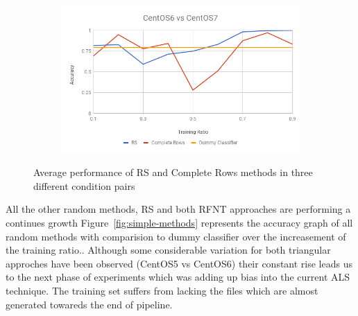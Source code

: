 \documentclass[10pt, conference, compsocconf]{IEEEtran}
\begin{document}
\begin{figure}[h!]
\begin{subfigure}[b]{0.4\linewidth}
        \end{subfigure}
        \begin{subfigure}[b]{0.4\linewidth}
                \includegraphics[width=\columnwidth]{figures/RS_Rows_6vs7}
        \end{subfigure}
        \caption{Average performance of RS and Complete Rows methods in three different condition pairs}
        \label{fig:RS_RowS}
\end{figure}

All the other random methods, RS and both RFNT approaches 
are performing a continues growth Figure~\ref{fig:simple-methods} represents
the accuracy graph of all random methods with comparision to dummy
classifier over the increasement of the training ratio.. Although some considerable variation 
for both triangular approches have been observed (CentOS5 vs CentOS6) 
their constant rise leads us to the next phase of experiments which was 
adding up bias into the current ALS technique. 
The training set suffers from lacking the files which are almost generated towareds the end of pipeline.
\end{document}
